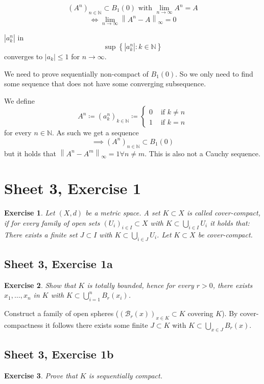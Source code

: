 \documentclass{article}
\newtheorem{ex}{Exercise} %
\newcommand{\set}[1]{\left\{#1\right\}}
\newcommand{\norm}[1]{\left\|#1\right\|}
\newcommand{\card}[1]{\left|#1\right|}
\begin{document}
\[ (A^n)_{n \in \mathbb N} \subset B_1(0) \text{ with } \lim_{n\to\infty} A^n = A \]
\[ \iff \lim_{n \to \infty} \norm{A^n - A}_{\infty} = 0 \]

$\card{a^n_k}$ in
\[ \sup\set{\card{a^n_k}: k \in \mathbb N}  \]
converges to $\card{a_k} \leq 1$ for $n \to \infty$.

We need to prove sequentially non-compact of $B_1(0)$.
So we only need to find some sequence that does not have some converging subsequence.

We define
\[
  A^n \coloneqq (a^n_k)_{k \in \mathbb N} \coloneqq \begin{cases}
    0 & \text{ if } k \neq n \\
    1 & \text{ if } k = n
  \end{cases}
\]
for every $n \in \mathbb N$. As such we get a sequence
\[ \implies (A^n)_{n \in \mathbb N} \subset B_1(0) \]
but it holds that $\norm{A^n - A^m}_{\infty} = 1 \forall n \neq m$.
This is also not a Cauchy sequence.

\section{Sheet 3, Exercise 1}
\begin{ex}
  Let $(X,d)$ be a metric space. A set $K \subset X$ is called cover-compact,
  if for every family of open sets $(U_i)_{i \in I} \subset X$ with $K \subset \bigcup_{i \in I} U_i$ it holds that:
  There exists a finite set $J \subset I$ with $K \subset \bigcup_{i \in J} U_i$. Let $K \subset X$ be cover-compact.
\end{ex}

\subsection{Sheet 3, Exercise 1a}
\begin{ex}
  Show that $K$ is totally bounded, hence for every $r>0$, there exists $x_1, \dots, x_n$ in $K$
  with $K \subset \bigcup_{i=1}^n B_r(x_i)$.
\end{ex}

Construct a family of open spheres ($\left(\mathcal B_r(x)\right)_{x \in K} \subset K$ covering $K$).
By cover-compactness it follows there exists some finite $J \subset K$ with $K \subset \bigcup_{x \in J} B_r(x)$.

\subsection{Sheet 3, Exercise 1b}
\begin{ex}
  Prove that $K$ is sequentially compact.
\end{ex}
\end{document}

